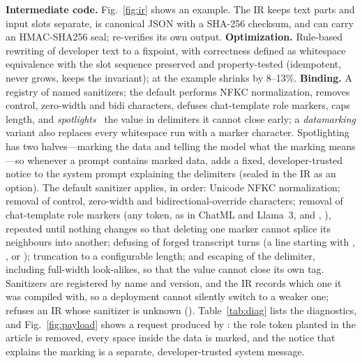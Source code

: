 \documentclass[journal]{IEEEtran}
\begin{document}
\textbf{Intermediate code.} Fig.~\ref{fig:ir} shows an example. The IR keeps text parts and input slots separate, is canonical JSON with a SHA-256 checksum, and can carry an HMAC-SHA256 seal;  re-verifies its own output. \textbf{Optimization.} Rule-based rewriting of developer text to a fixpoint, with correctness defined as whitespace equivalence with the slot sequence preserved and property-tested (idempotent, never grows, keeps the invariant); at  the example shrinks by 8--13\%. \textbf{Binding.} A registry of named sanitizers; the default performs NFKC normalization, removes control, zero-width and bidi characters, defuses chat-template role markers, caps length, and \emph{spotlights}~\cite{hines2024spotlighting} the value in  delimiters it cannot close early; a \emph{datamarking} variant also replaces every whitespace run with a marker character. Spotlighting has two halves---marking the data and telling the model what the marking means---so whenever a prompt contains marked data,  adds a fixed, developer-trusted notice to the system prompt explaining the delimiters (sealed in the IR as an option). The default sanitizer applies, in order: Unicode NFKC normalization; removal of control, zero-width and bidirectional-override characters; removal of chat-template role markers (any \code{<|\dots|>} token, as in ChatML and Llama~3, and \code{[INST]}, ), repeated until nothing changes so that deleting one marker cannot splice its neighbours into another; defusing of forged transcript turns (a line starting with , ,  or ); truncation to a configurable length; and escaping of the delimiter, including full-width look-alikes, so that the value cannot close its own  tag. Sanitizers are registered by name and version, and the IR records which one it was compiled with, so a deployment cannot silently switch to a weaker one;  refuses an IR whose sanitizer is unknown (). Table~\ref{tab:diag} lists the diagnostics, and Fig.~\ref{fig:payload} shows a request produced by : the role token planted in the article is removed, every space inside the data is marked, and the notice that explains the marking is a separate, developer-trusted system message.
\end{document}
